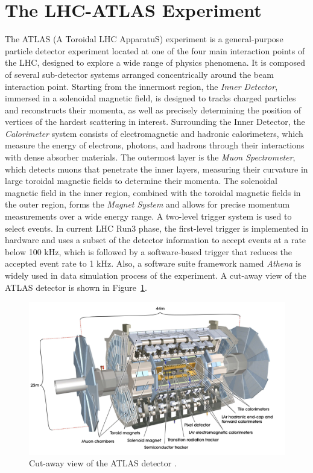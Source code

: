 \section{The LHC-ATLAS Experiment} \label{ATLAS}
The ATLAS (A Toroidal LHC ApparatuS) experiment is a general-purpose particle detector experiment located at one of the four main interaction points of the LHC, designed to explore a wide range of physics phenomena. It is composed of several sub-detector systems arranged concentrically around the beam interaction point. Starting from the innermost region, the \textit{Inner Detector}, immersed in a solenoidal magnetic field, is designed to tracks charged particles and reconstructs their momenta, as well as precisely determining the position of vertices of the hardest scattering in interest. Surrounding the Inner Detector, the \textit{Calorimeter} system consists of electromagnetic and hadronic calorimeters, which measure the energy of electrons, photons, and hadrons through their interactions with dense absorber materials. The outermost layer is the \textit{Muon Spectrometer}, which detects muons that penetrate the inner layers, measuring their curvature in large toroidal magnetic fields to determine their momenta. The solenoidal magnetic field in the inner region, combined with the toroidal magnetic fields in the outer region, forms the \textit{Magnet System} and allows for precise momentum measurements over a wide energy range. A two-level trigger system is used to select events. In current LHC Run3 phase, the first-level trigger is implemented in hardware and uses a subset of the detector information to accept events at a rate below 100 kHz, which is followed by a software-based trigger that reduces the accepted event rate to 1 kHz. Also, a software suite framework named \textit{Athena} is widely used in data simulation process of the experiment.
A cut-away view of the ATLAS detector is shown in Figure~\ref{fig:ATLASDetector}.
\begin{figure}[htbp]
  \centering
  \includegraphics[width=1.0\textwidth]{figs/chapter1/ATLAS.png}
  \caption{Cut-away view of the ATLAS detector \cite{ATLASDetector2008}.}
  \label{fig:ATLASDetector}
\end{figure}
